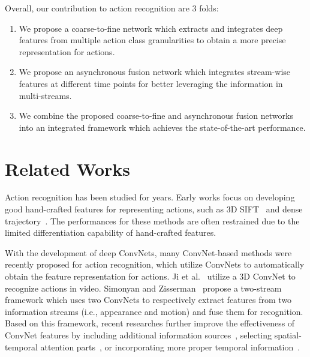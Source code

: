 \documentclass[letterpaper]{article} %
\begin{document}
Overall, our contribution to action recognition are 3 folds:
\begin{enumerate}
 \item We propose a coarse-to-fine network which extracts and integrates deep features from multiple action class granularities to obtain a more precise representation for actions.
 \item We propose an asynchronous fusion network which integrates stream-wise features at different time points for better leveraging the information in multi-streams.
 \item We combine the proposed coarse-to-fine and asynchronous fusion networks into an integrated framework which achieves the state-of-the-art performance.
\end{enumerate}



\section{Related Works\label{section:related_work}}

Action recognition has been studied for years. Early works focus on developing good hand-crafted features for representing actions, such as 3D SIFT~\cite{3dsift} and dense trajectory~\cite{iDT}. The performances for these methods are often restrained due to the limited differentiation capability of hand-crafted features.

With the development of deep ConvNets, many ConvNet-based methods were recently proposed for action recognition, which utilize ConvNets to automatically obtain the feature representation for actions. Ji et al.~\cite{3dcnn2} utilize a 3D ConvNet to recognize actions in video. Simonyan and Zisserman~\cite{baseline} propose a two-stream framework which uses two ConvNets to respectively extract features from two information streams (i.e., appearance and motion) and fuse them for recognition. Based on this framework, recent researches further improve the effectiveness of ConvNet features by including additional information sources~\cite{3stream,3stream2}, selecting spatial-temporal attention parts~\cite{kar2016adascan,visualattention,KVMF}, or incorporating more proper temporal information~\cite{TSN,wumultifusion,cherian2017generalized,DIN}.
\end{document}
